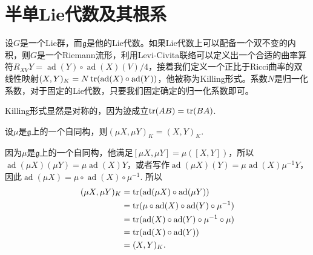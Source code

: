 \documentclass[9pt]{extarticle}
\newcommand{\lag}{{\mathfrak{g}}}
\DeclareMathOperator{\ad}{ad}
\begin{document}





\section{半单Lie代数及其根系}

\para 设$G$是一个Lie群，而$\lag$是他的Lie代数。如果Lie代数上可以配备一个双不变的内积，则$G$是一个Riemann流形，利用Levi-Civita联络可以定义出一个合适的曲率算符$R_{XV}Y=\ad(Y)\circ \ad(X)(V)/4$，接着我们定义一个正比于Ricci曲率的双线性映射$(X,Y)_K=N \tr(\ad(X)\circ \ad(Y))$，他被称为Killing形式。系数$N$是归一化系数，对于固定的Lie代数，只要我们固定确定的归一化系数即可。

Killing形式显然是对称的，因为迹成立$\operatorname{tr}(AB)=\operatorname{tr}(BA)$.

\para 设$\mu$是$\lag$上的一个自同构，则$(\mu X,\mu Y)_K=(X,Y)_K$.

因为$\mu$是$\lag$上的一个自同构，他满足$[\mu X,\mu Y]=\mu([X,Y])$，所以$\ad(\mu X)(\mu Y)=\mu\ad(X)Y$，或者写作$\ad(\mu X)(Y)=\mu\ad(X)\mu^{-1}Y$，因此$\ad(\mu X)=\mu\circ \ad(X)\circ \mu^{-1}$. 所以
\begin{align*}
	(\mu X,\mu Y)_K&=\tr(\ad(\mu X)\circ \ad(\mu Y))\\
	&=\tr(\mu\circ \ad(X)\circ \ad(Y)\circ \mu^{-1})\\&=\tr(\ad(X)\circ \ad(Y)\circ \mu^{-1}\circ \mu)\\&=\tr(\ad(X)\circ \ad(Y))\\&=(X,Y)_K.
\end{align*}
\end{document}
